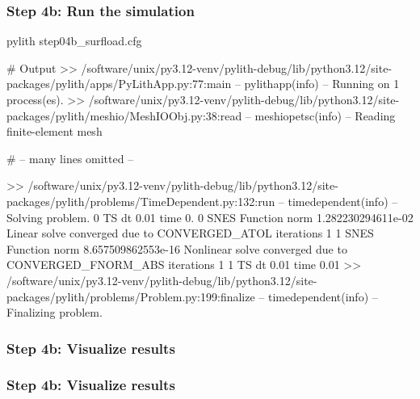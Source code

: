 \documentclass[aspectratio=169]{beamer}
\begin{document}
\begin{frame}[fragile]
  \frametitle{Step 4b: Run the simulation}
  \summary{}

\begin{bashcode}
pylith step04b_surfload.cfg

# Output
 >> /software/unix/py3.12-venv/pylith-debug/lib/python3.12/site-packages/pylith/apps/PyLithApp.py:77:main
 -- pylithapp(info)
 -- Running on 1 process(es).
 >> /software/unix/py3.12-venv/pylith-debug/lib/python3.12/site-packages/pylith/meshio/MeshIOObj.py:38:read
 -- meshiopetsc(info)
 -- Reading finite-element mesh

# -- many lines omitted --

 >> /software/unix/py3.12-venv/pylith-debug/lib/python3.12/site-packages/pylith/problems/TimeDependent.py:132:run
 -- timedependent(info)
 -- Solving problem.
0 TS dt 0.01 time 0.
    0 SNES Function norm 1.282230294611e-02
      Linear solve converged due to CONVERGED_ATOL iterations 1
    1 SNES Function norm 8.657509862553e-16
    Nonlinear solve converged due to CONVERGED_FNORM_ABS iterations 1
1 TS dt 0.01 time 0.01
 >> /software/unix/py3.12-venv/pylith-debug/lib/python3.12/site-packages/pylith/problems/Problem.py:199:finalize
 -- timedependent(info)
 -- Finalizing problem.
\end{bashcode}
  
\end{frame}


\begin{frame}
  \frametitle{Step 4b: Visualize results}

    
\end{frame}


\begin{frame}
  \frametitle{Step 4b: Visualize results}

    
\end{frame}
\end{document}
